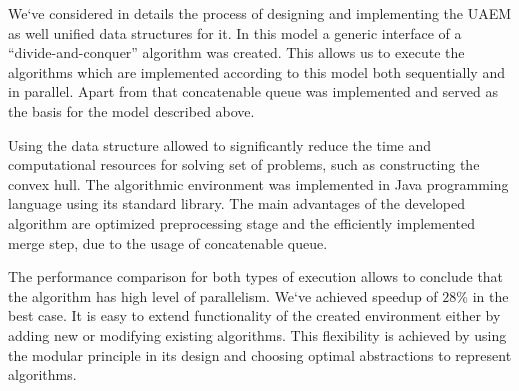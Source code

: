 \documentclass[a4paper,english,numberwithinsect,notab]{eurocg20-submission}
\begin{document}
	We`ve considered in details the process of designing and implementing the UAEM as well unified data structures for it. In this model a generic interface of a ``divide-and-conquer'' algorithm was created. This allows us to execute the algorithms which are implemented according to this model both sequentially and in parallel. Apart from that concatenable queue was implemented and served as the basis for the model described above.
	
	Using the data structure allowed to significantly reduce the time and computational resources for solving set of problems, such as constructing the convex hull. The algorithmic environment was implemented in Java programming language using its standard library. The main advantages of the developed algorithm are optimized preprocessing stage and the efficiently implemented merge step, due to the usage of concatenable queue.
	
	The performance comparison for both types of execution allows to conclude that the algorithm has high level of parallelism. We`ve achieved speedup of $28\%$ in the best case. It is easy to extend functionality of the created environment either by adding new or modifying existing algorithms. This flexibility is achieved by using the modular principle in its design and choosing optimal abstractions to represent algorithms.


\end{document}
